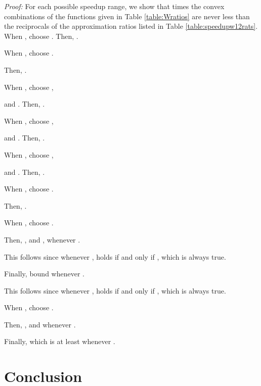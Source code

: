 \documentclass[11pt]{article}
\newcommand\QED{\ifhmode\allowbreak\else\nobreak\fi
\quad\nobreak\medbreak}
\newcommand{\proofstart}{\par\noindent \emph{Proof:} }
\newcommand{\proofend}{\QED\par}
\newenvironment{proof}{\proofstart}{\proofend}
\begin{document}
\begin{proof}
For each possible speedup range, we show that  times the convex combinations of the functions given in Table \ref{table:Wratios} are never less than the reciprocals of the approximation ratios listed in Table \ref{table:speedupw12rats}.\\

\noindent When , choose . Then, .\\\bigskip

\noindent When , choose .\medskip

\noindent Then, .\\\bigskip

\noindent When , choose , \medskip 

\noindent and .  Then, .\\\bigskip

\noindent When , choose ,\medskip

\noindent and . Then, .\\\bigskip

\noindent When , choose , \medskip

\noindent and .  Then, .\\\bigskip

\noindent When , choose .\medskip

\noindent Then, .\\\bigskip

\noindent When , choose .\medskip

\noindent Then, , and , whenever .\medskip

\noindent This follows since whenever ,  holds if and only if , which is always true.\medskip

\noindent Finally, bound  whenever . \medskip

\noindent This follows since whenever ,  holds if and only if , which is always true.\\\bigskip

\noindent When , choose .\medskip

\noindent Then, , and  whenever .\medskip

\noindent Finally,  which is at least   whenever .
\end{proof}


\section{Conclusion}
\end{document}

